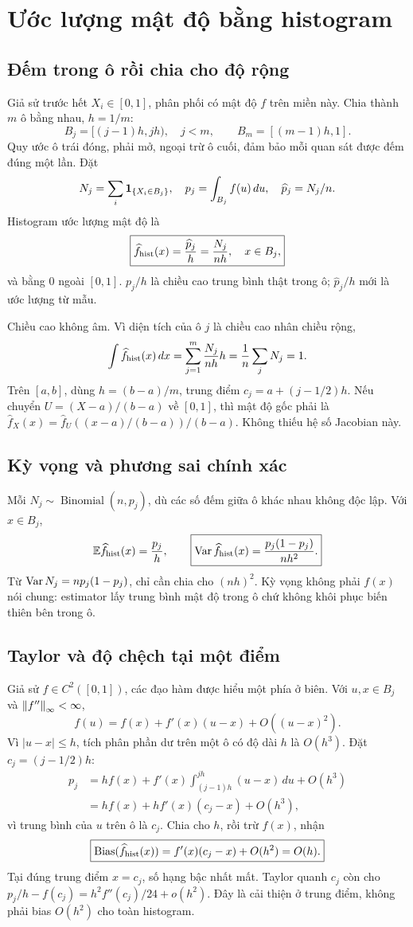 \chapter{Ước lượng mật độ bằng histogram}\label{ch:hist}
\section{Đếm trong ô rồi chia cho độ rộng}
Giả sử trước hết $X_i\in[0,1]$, phân phối có mật độ $f$ trên miền này.
Chia thành $m$ ô bằng nhau, $h=1/m$:
\[
B_j=[(j-1)h,jh),\quad j<m,\qquad B_m=[(m-1)h,1].
\]
Quy ước ô trái đóng, phải mở, ngoại trừ ô cuối, đảm bảo mỗi quan sát được
đếm đúng một lần. Đặt
\[
N_j=\sum_i\mathbf 1_{\{X_i\in B_j\}},\quad
p_j=\int_{B_j}f(u)\,du,\quad \widehat p_j=N_j/n.
\]
Histogram ước lượng mật độ là
\[
\boxed{\widehat f_{\rm hist}(x)=\frac{\widehat p_j}{h}
=\frac{N_j}{nh},\quad x\in B_j,}
\]
và bằng 0 ngoài $[0,1]$. $p_j/h$ là chiều cao trung bình thật trong ô;
$\widehat p_j/h$ mới là ước lượng từ mẫu.

Chiều cao không âm. Vì diện tích của ô $j$ là chiều cao nhân chiều rộng,
\[
\int\widehat f_{\rm hist}(x)\,dx
=\sum_{j=1}^m\frac{N_j}{nh}h
=\frac1n\sum_jN_j=1.
\]
Trên $[a,b]$, dùng $h=(b-a)/m$, trung điểm
$c_j=a+(j-1/2)h$. Nếu chuyển $U=(X-a)/(b-a)$ về $[0,1]$,
thì mật độ gốc phải là $\widehat f_X(x)=\widehat f_U((x-a)/(b-a))/(b-a)$.
Không thiếu hệ số Jacobian này.

\section{Kỳ vọng và phương sai chính xác}
Mỗi $N_j\sim\operatorname{Binomial}(n,p_j)$, dù các số đếm giữa ô khác
nhau không độc lập. Với $x\in B_j$,
\[
\mathbb E\widehat f_{\rm hist}(x)=\frac{p_j}{h},\qquad
\boxed{\operatorname{Var}\widehat f_{\rm hist}(x)=\frac{p_j(1-p_j)}{nh^2}.}
\]
Từ $\operatorname{Var} N_j=np_j(1-p_j)$, chỉ cần chia cho $(nh)^2$.
Kỳ vọng không phải $f(x)$ nói chung: estimator lấy trung bình mật độ
trong ô chứ không khôi phục biến thiên bên trong ô.

\section{Taylor và độ chệch tại một điểm}
Giả sử $f\in C^2([0,1])$, các đạo hàm được hiểu một phía ở biên.
Với $u,x\in B_j$ và $\left\lVert f''\right\rVert_\infty<\infty$,
\[
f(u)=f(x)+f'(x)(u-x)+O((u-x)^2).
\]
Vì $|u-x|\leq h$, tích phân phần dư trên một ô có độ dài $h$ là $O(h^3)$.
Đặt $c_j=(j-1/2)h$:
\begin{align*}
p_j&=hf(x)+f'(x)\int_{(j-1)h}^{jh}(u-x)\,du+O(h^3)\\
&=hf(x)+hf'(x)(c_j-x)+O(h^3),
\end{align*}
vì trung bình của $u$ trên ô là $c_j$.
Chia cho $h$, rồi trừ $f(x)$, nhận
\[
\boxed{\operatorname{Bias}(\widehat f_{\rm hist}(x))
=f'(x)(c_j-x)+O(h^2)=O(h).}
\]
Tại đúng trung điểm $x=c_j$, số hạng bậc nhất mất. Taylor quanh $c_j$
còn cho $p_j/h-f(c_j)=h^2f''(c_j)/24+o(h^2)$.
Đây là cải thiện ở trung điểm, không phải bias $O(h^2)$ cho toàn histogram.

